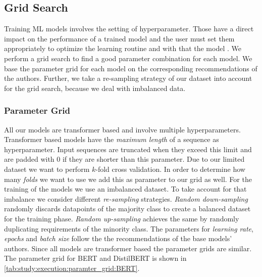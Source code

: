 
\subsection{Grid Search}
\label{chp:study:sec:execution:subsec:gridsearch}
Training \ac{ML} models involves the setting of hyperparameter.
Those have a direct impact on the performance of a trained model and the user must set them appropriately to optimize the learning routine and with that the model \parencite{Claesen:2015}.
We perform a grid search to find a good parameter combination for each model.
We base the parameter grid for each model on the corresponding recommendations of the authors.
Further, we take a re-sampling strategy of our dataset into account for the grid search, because we deal with imbalanced data.

\subsubsection{Parameter Grid}
\label{chp:study:sec:execution:subsec:gridsearch:parameter_grid}
All our models are transformer based and involve multiple hyperparameters.
Transformer based models have the \textit{maximum length} of a sequence as hyperparameter.
Input sequences are truncated when they exceed this limit and are padded with 0 if they are shorter than this parameter.
Due to our limited dataset we want to perform $k$-fold cross validation.
In order to determine how many \textit{folds} we want to use we add this as parameter to our grid as well.
For the training of the models we use an imbalanced dataset.
To take account for that imbalance we consider different \textit{re-sampling} strategies.
\textit{Random down-sampling} randomly discards datapoints of the majority class to create a balanced dataset for the training phase.
\textit{Random up-sampling} achieves the same by randomly duplicating requirements of the minority class.
The parameters for \textit{learning rate}, \textit{epochs} and \textit{batch size} follow the the recommendations of the base models' authors.
Since all models are transformer based the parameter grids are similar.
The parameter grid for \ac{BERT} and \ac{DistilBERT} is shown in \cref{tab:study:execution:paramter_grid:BERT}.
